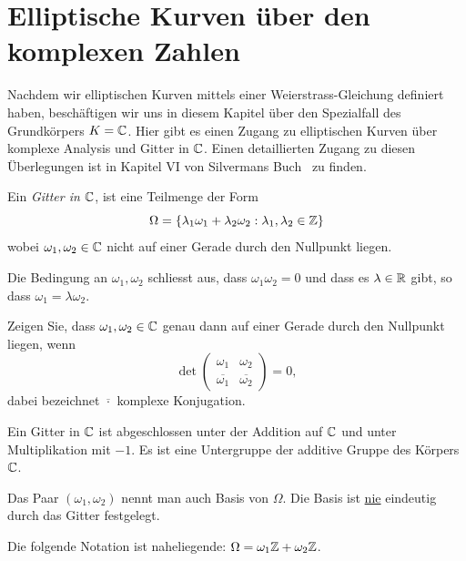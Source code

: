 \chapter{Elliptische Kurven über den komplexen Zahlen}

Nachdem wir elliptischen Kurven mittels einer Weierstrass-Gleichung
definiert haben, beschäftigen wir uns in diesem Kapitel über den
Spezialfall des Grundkörpers $K={\mathbb{C}}$. Hier gibt es einen Zugang zu
elliptischen Kurven über komplexe Analysis und Gitter in ${\mathbb{C}}$. Einen
detaillierten Zugang zu diesen Überlegungen ist in Kapitel VI von
Silvermans Buch~\cite{Silverman:AEC} zu finden. 

\begin{definition}
  Ein \emph{Gitter in ${\mathbb{C}}$}, ist eine
  Teilmenge der Form
  $$\Omega = \{\lambda_1 \omega_1 + \lambda_2 \omega_2 :
  \lambda_1,\lambda_2\in{\mathbb{Z}}\}$$
  wobei $\omega_1,\omega_2\in{\mathbb{C}}$ nicht auf einer Gerade
  durch den Nullpunkt liegen. 
\end{definition}

Die Bedingung an $\omega_1,\omega_2$ schliesst aus, dass
$\omega_1\omega_2=0$ und dass es $\lambda\in{\mathbb{R}}$ gibt, so dass
$\omega_1 = \lambda\omega_2$.

\begin{aufgabe}
  Zeigen Sie, dass $\omega_1,\omega_2\in{\mathbb{C}}$ genau dann auf einer
  Gerade durch den Nullpunkt liegen, wenn
  \begin{equation*}
    \det \left(
      \begin{array}{ll}
        \omega_1 & \omega_2 \\
        \overline{\omega_1} & \overline{\omega_2}
      \end{array}
    \right)=0,
  \end{equation*}
  dabei bezeichnet $\overline{\cdot}$ komplexe Konjugation. 
\end{aufgabe}

Ein Gitter in ${\mathbb{C}}$ ist abgeschlossen unter der Addition auf
${\mathbb{C}}$ und unter Multiplikation mit $-1$. Es ist eine Untergruppe der
additive Gruppe des Körpers ${\mathbb{C}}$.

Das Paar $(\omega_1,\omega_2)$ nennt man auch Basis von
$\Omega$. Die Basis ist \underline{nie}  eindeutig durch das Gitter festgelegt.

Die folgende Notation ist naheliegende: $\Omega = \omega_1{\mathbb{Z}} +\omega_2{\mathbb{Z}}$.


